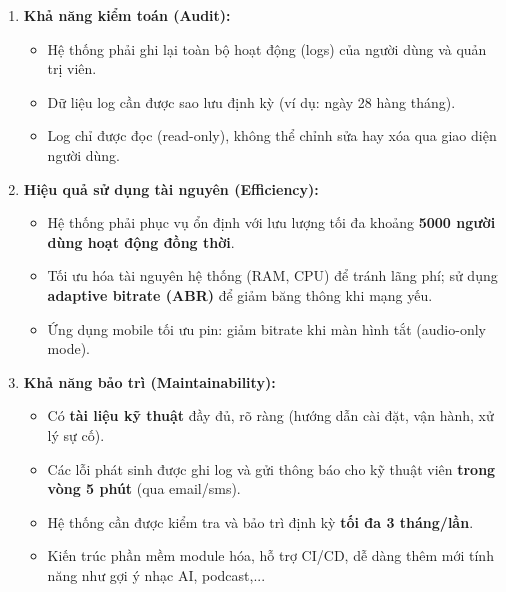 \begin{enumerate}
    \item \textbf{Khả năng kiểm toán (Audit):}
    \begin{itemize}
        \item Hệ thống phải ghi lại toàn bộ hoạt động (logs) của người dùng và quản trị viên.
        \item Dữ liệu log cần được sao lưu định kỳ (ví dụ: ngày 28 hàng tháng).
        \item Log chỉ được đọc (read-only), không thể chỉnh sửa hay xóa qua giao diện người dùng.
    \end{itemize}

    \item \textbf{Hiệu quả sử dụng tài nguyên (Efficiency):}
    \begin{itemize}
        \item Hệ thống phải phục vụ ổn định với lưu lượng tối đa khoảng \textbf{5000 người dùng hoạt động đồng thời}.
        \item Tối ưu hóa tài nguyên hệ thống (RAM, CPU) để tránh lãng phí; sử dụng \textbf{adaptive bitrate (ABR)} để giảm băng thông khi mạng yếu.
        \item Ứng dụng mobile tối ưu pin: giảm bitrate khi màn hình tắt (audio-only mode).
    \end{itemize}

    \item \textbf{Khả năng bảo trì (Maintainability):}
    \begin{itemize}
        \item Có \textbf{tài liệu kỹ thuật} đầy đủ, rõ ràng (hướng dẫn cài đặt, vận hành, xử lý sự cố).
        \item Các lỗi phát sinh được ghi log và gửi thông báo cho kỹ thuật viên \textbf{trong vòng 5 phút} (qua email/sms).
        \item Hệ thống cần được kiểm tra và bảo trì định kỳ \textbf{tối đa 3 tháng/lần}.
        \item Kiến trúc phần mềm module hóa, hỗ trợ CI/CD, dễ dàng thêm mới tính năng như gợi ý nhạc AI, podcast,...
    \end{itemize}
\end{enumerate}